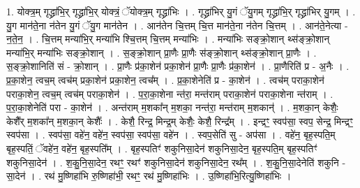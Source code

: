 \documentclass[17pt]{extarticle}
\begin{document}
1. योक्त्र॒म् गृद्ध्रा॑भि॒र् गृद्ध्रा॑भि॒र् योक्त्रं॒ ॅयोक्त्र॒म् गृद्ध्रा॑भिः । . गृद्ध्रा॑भिर् यु॒गं ॅयु॒गम् गृद्ध्रा॑भि॒र् गृद्ध्रा॑भिर् यु॒गम् । . यु॒ग मान॑ते॒ना न॑तेन यु॒गं ॅयु॒ग मान॑तेन । . आन॑तेन चि॒त्तम् चि॒त्त मान॑ते॒ना न॑तेन चि॒त्तम् । . आन॑ते॒नेत्या - न॒ते॒न॒ । . चि॒त्तम् मन्या॑भि॒र् मन्या॑भि श्चि॒त्तम् चि॒त्तम् मन्या॑भिः । . मन्या॑भिः सङ्क्रो॒शान् थ्स॑ङ्क्रो॒शान् मन्या॑भि॒र् मन्या॑भिः सङ्क्रो॒शान् । . स॒ङ्क्रो॒शान् प्रा॒णैः प्रा॒णैः स॑ङ्क्रो॒शान् थ्स॑ङ्क्रो॒शान् प्रा॒णैः । . स॒ङ्क्रो॒शानिति॑ सं - क्रो॒शान् । . प्रा॒णैः प्र॑का॒शेन॑ प्रका॒शेन॑ प्रा॒णैः प्रा॒णैः प्र॑का॒शेन॑ । . प्रा॒णैरिति॑ प्र - अ॒नैः । . प्र॒का॒शेन॒ त्वच॒म् त्वच॑म् प्रका॒शेन॑ प्रका॒शेन॒ त्वच᳚म् । . प्र॒का॒शेनेति॑ प्र - का॒शेन॑ । . त्वच॑म् पराका॒शेन॑ पराका॒शेन॒ त्वच॒म् त्वच॑म् पराका॒शेन॑ । . प॒रा॒का॒शेना न्त॑रा॒ मन्त॑राम् पराका॒शेन॑ पराका॒शेना न्त॑राम् । . प॒रा॒का॒शेनेति॑ परा - का॒शेन॑ । . अन्त॑राम् म॒शका᳚न् म॒शका॒ नन्त॑रा॒ मन्त॑राम् म॒शकान्॑ । . म॒शका॒न् केशैः॒ केशै᳚र् म॒शका᳚न् म॒शका॒न् केशैः᳚ । . केशै॒ रिन्द्र॒ मिन्द्र॒म् केशैः॒ केशै॒ रिन्द्र᳚म् । . इन्द्रꣳ॒॒ स्वप॑सा॒ स्वप॒ सेन्द्र॒ मिन्द्रꣳ॒॒ स्वप॑सा । . स्वप॑सा॒ वहे॑न॒ वहे॑न॒ स्वप॑सा॒ स्वप॑सा॒ वहे॑न । . स्वप॒सेति॑ सु - अप॑सा । . वहे॑न॒ बृह॒स्पति॒म् बृह॒स्पतिं॒ ॅवहे॑न॒ वहे॑न॒ बृह॒स्पति᳚म् । . बृह॒स्पतिꣳ॑ शकुनिसा॒देन॑ शकुनिसा॒देन॒ बृह॒स्पति॒म् बृह॒स्पतिꣳ॑ शकुनिसा॒देन॑ । . श॒कु॒नि॒सा॒देन॒ रथꣳ॒॒ रथꣳ॑ शकुनिसा॒देन॑ शकुनिसा॒देन॒ रथ᳚म् । . श॒कु॒नि॒सा॒देनेति॑ शकुनि - सा॒देन॑ । . रथ॑ मु॒ष्णिहा॑भि रु॒ष्णिहा॑भी॒ रथꣳ॒॒ रथ॑ मु॒ष्णिहा॑भिः । . उ॒ष्णिहा॑भि॒रित्यु॒ष्णिहा॑भिः । \newline
\end{document}
